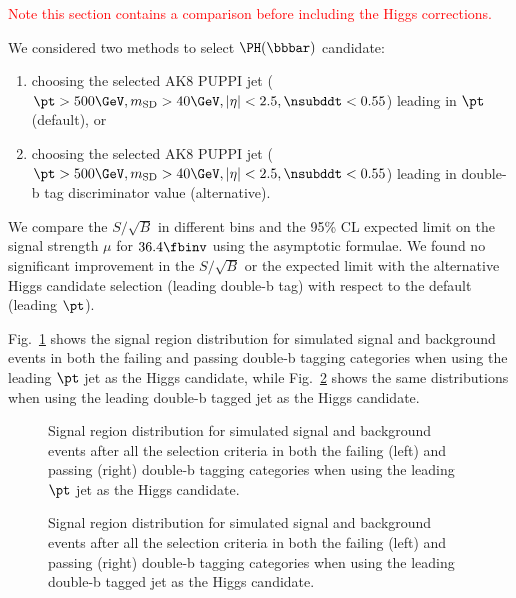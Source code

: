 \textcolor{red}{Note this section contains a comparison before including the Higgs \pt corrections. }

We considered two methods to select $\PH(\bbbar)$ candidate:
\begin{enumerate}
\item choosing the selected AK8 PUPPI jet ($\pt > 500\GeV, m_{\mathrm{SD}} > 40\GeV, |\eta|<2.5, \nsubddt<0.55$) leading in $\pt$ (default), or
\item choosing the selected AK8 PUPPI jet ($\pt > 500\GeV, m_{\mathrm{SD}} > 40\GeV, |\eta|<2.5, \nsubddt<0.55$) leading in double-b tag discriminator value (alternative).
\end{enumerate} 
We compare the $S/\sqrt{B}$ in different bins and the 95\% CL expected limit on the signal strength $\mu$ for $36.4\fbinv$ using the asymptotic formulae. We found no significant improvement in the $S/\sqrt{B}$ or the expected limit with the alternative Higgs candidate selection (leading double-b tag) with respect to the default (leading $\pt$).

Fig.~\ref{fig:stackSR_ptleading} shows the signal region \mSD distribution for simulated signal and background events in both the failing and passing double-b tagging categories when using the leading $\pt$ jet as the Higgs candidate, while Fig.~\ref{fig:stackSR_bbleading} shows the same distributions when using the leading double-b tagged jet as the Higgs candidate.

\begin{figure}[hbtp]\begin{center}
	\caption{Signal region \mSD distribution for simulated signal and background events after all the selection criteria in both the failing (left) and passing (right) double-b tagging categories when using the leading $\pt$ jet as the Higgs candidate.}
	\label{fig:stackSR_ptleading}
	\end{center}
 \end{figure}

\begin{figure}[hbtp]\begin{center}
	\caption{Signal region \mSD distribution for simulated signal and background events after all the selection criteria in both the failing (left) and passing (right) double-b tagging categories when using the leading double-b tagged jet as the Higgs candidate.}
	\label{fig:stackSR_bbleading}
	\end{center}
 \end{figure}

